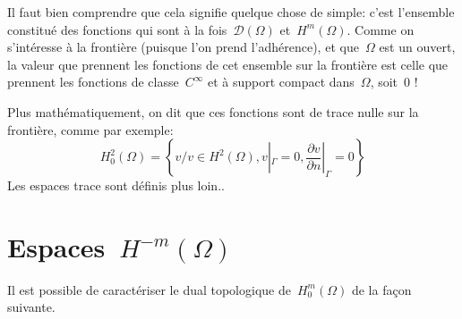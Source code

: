 \medskip
\begin{remarque}
Il faut bien comprendre que cela signifie quelque chose de simple: c'est l'ensemble constitué des
fonctions qui sont à la fois~$\mathcal{D}(\Omega)$ et~$H^m(\Omega)$.
Comme on s'intéresse à la frontière (puisque l'on prend l'adhérence), et que~$\Omega$ est un
ouvert, la valeur que prennent les fonctions de cet ensemble sur la frontière est celle
que prennent les fonctions de classe~$C^\infty$ et à support compact dans~$\Omega$,
soit~$0$ !
\end{remarque}

Plus mathématiquement, on dit que ces fonctions sont de trace nulle sur la frontière, comme par exemple:
\begin{equation}
  H_0^2(\Omega)=\left\{v / v\in H^2(\Omega), v|_\Gamma=0,
  \frac{\partial v}{\partial n}|_\Gamma=0\right\}
\end{equation}
Les espaces trace sont définis plus loin..
\medskipvm
{}


\medskip
\section{Espaces~$H^{-m}(\Omega)$}

Il est possible de caractériser le dual topologique de~$H^m_0(\Omega)$ de la façon suivante.

